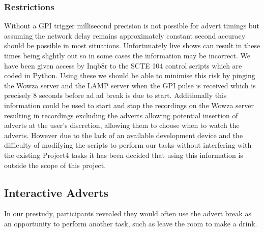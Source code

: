 \subsubsection{Restrictions}
Without a GPI trigger millisecond precision is not possible for advert timings but assuming the network delay remains approximately constant second accuracy should be possible in most situations. Unfortunately live shows can result in these times being slightly out so in some cases the information may be incorrect. We have been given access by Inqb8r to the SCTE 104 control scripts which are coded in Python. Using these we should be able to minimise this risk by pinging the Wowza server and the LAMP server when the GPI pulse is received which is precisely 8 seconds before ad ad break is due to start. Additionally this information could be used to start and stop the recordings on the Wowza server resulting in recordings excluding the adverts allowing potential insertion of adverts at the user's discretion, allowing them to choose when to watch the adverts. However due to the lack of an available development device and the difficulty of modifying the scripts to perform our tasks without interfering with the existing Project4 tasks it has been decided that using this information is outside the scope of this project.

\subsection{Interactive Adverts}

In our prestudy, participants revealed they would often use the advert break as an opportunity to perform another task, such as leave the room to make a drink.


